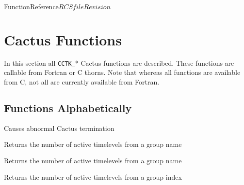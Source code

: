 
\begin{cactuspart}{FunctionReference}{$RCSfile$}{$Revision$}
\label{part:FunctionReference}
\renewcommand{\thepage}{\Alph{part}\arabic{page}}


\chapter{Cactus Functions}

In this section all \hbox{{\tt CCTK\_}*} Cactus functions are described.
These functions are callable from Fortran or C thorns.  Note that whereas
all functions are available from C, not all are currently available
from Fortran.


\section{Functions Alphabetically}

\begin{Lentry}

\item[CCTK\_Abort]
  [\pageref{CCTK-Abort}]
  Causes abnormal Cactus termination

\item[CCTK\_ActiveTimeLevels]
  [\pageref{CCTK-ActiveTimeLevels}]
  Returns the number of active timelevels from a group name

\item[CCTK\_ActiveTimeLevelsGN]
  [\pageref{CCTK-ActiveTimeLevels}]
  Returns the number of active timelevels from a group name

\item[CCTK\_ActiveTimeLevelsGI]
  [\pageref{CCTK-ActiveTimeLevels}]
  Returns the number of active timelevels from a group index


\end{Lentry}
\end{cactuspart}
